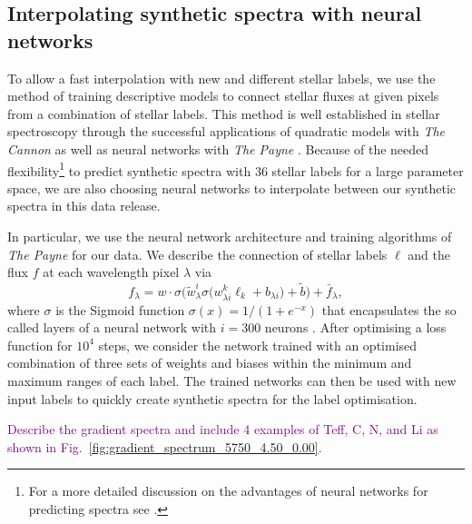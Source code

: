 \documentclass[
  journal=pasa,
  manuscript=research-paper, %
  year=2023,
  volume=37
]{cup-journal}
\newcommand{\SB}[1]{{\textcolor{purple}{#1}}}
\begin{document}
\subsection{Interpolating synthetic spectra with neural networks} \label{sec:interpolating_synthetic_spectra_with_neural_networks}

To allow a fast interpolation with new and different stellar labels, we use the method of training descriptive models to connect stellar fluxes at given pixels from a combination of stellar labels. This method is well established in stellar spectroscopy through the successful applications of quadratic models with \textit{The Cannon} \citep[see e.g.][]{Ness2015, Ness2016, Casey2016, Casey2017, Ho2017, Buder2018} as well as neural networks with \textit{The Payne} \citep[see e.g.][]{Ting2019, Xiang2019, Xiang2021}. Because of the needed flexibility\footnote{For a more detailed discussion on the advantages of neural networks for predicting spectra see \citet{Ting2019}.} to predict synthetic spectra with 36 stellar labels for a large parameter space, we are also choosing neural networks to interpolate between our synthetic spectra in this data release.

In particular, we use the neural network architecture and training algorithms of \textit{The Payne} \citep{Ting2019} for our data. We describe the connection of stellar labels $\boldsymbol{\ell}$ and the flux $f$ at each wavelength pixel $\lambda$ via
\begin{equation}
f_\lambda = w \cdot \sigma\bigg( \tilde{w}_\lambda^i \sigma \Big( w^k_{\lambda i} \ell_k + b_{\lambda i} \Big) + \tilde{b} \bigg) + \bar{f}_\lambda,
\label{eq:neural_network_function}
\end{equation}
where $\sigma$ is the Sigmoid function $\sigma (x) = 1/(1 + e^{-x})$ that encapsulates the so called layers of a neural network with $i = 300$ neurons \citep[see ][for more details]{Ting2019}. After optimising a loss function for $10^4$ steps, we consider the network trained with an optimised combination of three sets of weights and biases within the minimum and maximum ranges of each label. The trained networks can then be used with new input labels to quickly create synthetic spectra for the label optimisation.

\SB{Describe the gradient spectra and include 4 examples of Teff, C, N, and Li as shown in Fig.~\ref{fig:gradient_spectrum_5750_4.50_0.00}.}
\end{document}
